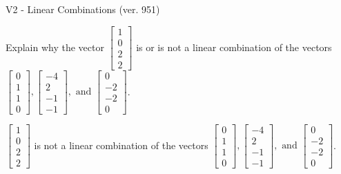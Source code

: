 \begin{exercise}
  \begin{exerciseTitle}V2 - Linear Combinations (ver. 951)\end{exerciseTitle}
  \begin{exerciseStatement}
    Explain why the vector \(\left[\begin{array}{c}
1 \\
0 \\
2 \\
2
\end{array}\right]\)  is or is not a linear 
	combination of the vectors \(\left[\begin{array}{c}
0 \\
1 \\
1 \\
0
\end{array}\right] , \left[\begin{array}{c}
-4 \\
2 \\
-1 \\
-1
\end{array}\right] , \text{ and } \left[\begin{array}{c}
0 \\
-2 \\
-2 \\
0
\end{array}\right]\).
	


  \end{exerciseStatement}
  \begin{exerciseAnswer}
   \(\left[\begin{array}{c}
1 \\
0 \\
2 \\
2
\end{array}\right]\) 
  	 is not  
	a linear combination of the vectors \(\left[\begin{array}{c}
0 \\
1 \\
1 \\
0
\end{array}\right] , \left[\begin{array}{c}
-4 \\
2 \\
-1 \\
-1
\end{array}\right] , \text{ and } \left[\begin{array}{c}
0 \\
-2 \\
-2 \\
0
\end{array}\right]\).

	
  


  \end{exerciseAnswer}
\end{exercise}